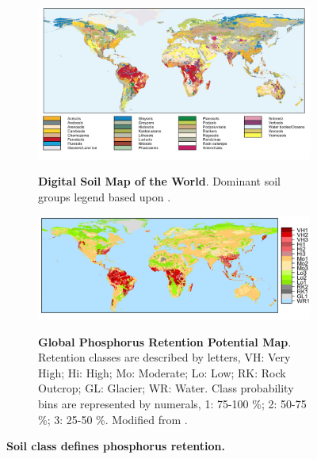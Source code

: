 \documentclass[10pt,letterpaper]{article}
\begin{document}
\begin{figure}[!bh] %

\centering

\begin{subfigure}[b]{\textwidth}
   \includegraphics[width=0.9\linewidth]{fig1top.png}
   \label{fig0top} 
   \caption{\textbf{Digital Soil Map of the World}. Dominant soil groups \cite{fao1995} legend based upon \cite{faogis1999,fao1974a}.}
   \bigskip
\end{subfigure} 


\begin{subfigure}[b]{\textwidth}
   \includegraphics[width=1\linewidth]{fig1bottom.png}
   \label{fig0bottom} 
   \caption{\textbf{Global Phosphorus Retention Potential Map}. Retention classes are described by letters, VH: Very High; Hi: High; Mo: Moderate; Lo: Low; RK: Rock Outcrop; GL: Glacier; WR: Water. Class probability bins are represented by numerals, 1: 75-100 \%; 2: 50-75 \%; 3: 25-50 \%. Modified from \cite{batjes2011}.}
   \bigskip
\end{subfigure}


\caption{\textbf{Soil class defines phosphorus retention.}}
\label{fig1}

\end{figure}
\end{document}
